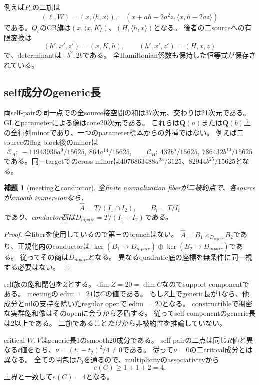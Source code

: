 \documentclass[11pt,a4paper]{ltjsarticle}
\newcommand{\QQ}{\mathbf Q}
\newcommand{\CA}{\mathcal C_A}
\newcommand{\CB}{\mathcal C_B}
\newcommand{\edim}{\operatorname{edim}}
\newtheorem{lemma}[theorem]{補題}
\theoremstyle{definition}
\theoremstyle{remark}
\begin{document}
例えば$P_a$の二旗は
\[
 (\ell,W)=(x,\langle h,x\rangle),\quad
 (x+ah-2a^2z,\langle x,h-2az\rangle)
\]
である。$Q_b$のCB旗は$(x,\langle x,K\rangle)$、$(H,\langle h,x\rangle)$となる。
後者の二sourceへの有限変換は
\[
 (h',x',z')=(x,K,h),\qquad (h',x',z')=(H,x,z)
\]
で、determinantは$-b^2,2b$である。
全Hamiltonian係数も保持した恒等式が保存されている。

\subsection{self成分のgeneric長}

両self-pairの同一点での全source接空間の和は37次元、交わりは21次元である。
GLとparameterによる像はcone20次元である。
これらは$\QQ(a)$または$\QQ(b)$上の全行列minorであり、一つのparameter標本からの外挿ではない。
例えば二sourceのflag block後のminorは
\[
 \CA:\ -11943936a^9/15625,\ 864a^{14}/15625,
 \qquad
 \CB:\ 432b^5/15625,\ 786432b^{10}/15625
\]
である。同一targetでのcross minorは$4076863488a^{25}/3125$、$82944b^{25}/15625$となる。

\begin{lemma}[meetingとconductor]\label{lem:glue}
全finite normalization fiberが二被約点で、各sourceがsmooth immersionなら、
\[
 \widehat A=T/(I_1\cap I_2),\qquad B_i=T/I_i
\]
であり、conductor商は$D_{
m pair}=T/(I_1+I_2)$である。
\end{lemma}
\begin{proof}
全fiberを使用しているので第三のbranchはない。
$\widehat A=B_1\times_{D_{
m pair}}B_2$であり、正規化内のconductorは
$\ker(B_1\to D_{
m pair})\oplus\ker(B_2\to D_{
m pair})$である。
従ってその商は$D_{
m pair}$となる。
異なるquadratic底の座標を無条件に同一視する必要はない。
\end{proof}

self族の飽和閉包を$Z$とする。$\dim Z=20=\dim C$なのでsupport componentである。
meetingの$\edim=21$は$C$の値である。
もし$Z$上でgeneric長が1なら、他成分とnilの支持を除いたregular openで$\edim=20$となる。
constructibleで稠密な実群飽和像はそのopenに会うから矛盾する。
従ってself componentのgeneric長は2以上である。
二旗であること\emph{だけ}から非被約性を推論していない。

critical $W,V$はgeneric長1のsmooth20成分である。
self-pairの二点は同じ$R$値と異なる$t$値をもち、$\nu=(t_1-t_2)^2/4\ne0$である。
従って$\nu=0$の二critical成分とは異なる。
全ての閉包は$P_0$を通るので、multiplicityのassociativityから
\[
 e(C)\ge1+1+2=4.
\]
上界と一致して$e(C)=4$となる。
\end{document}
